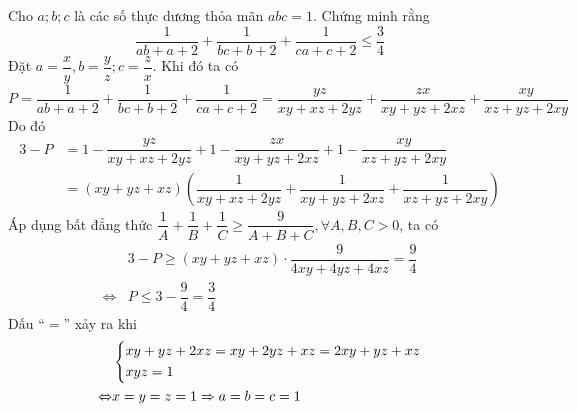 \begin{ex}%
   Cho $a;b;c$ là các số thực dương thỏa mãn $abc=1$. Chứng minh rằng \[\dfrac{1}{ab+a+2}+\dfrac{1}{bc+b+2}+\dfrac{1}{ca+c+2}\le \dfrac{3}{4}\]
\loigiai
{
Đặt $a=\dfrac{x}{y},b=\dfrac{y}{z};c=\dfrac{z}{x}$. Khi đó ta có \[P=\dfrac{1}{ab+a+2}+\dfrac{1}{bc+b+2}+\dfrac{1}{ca+c+2}=\dfrac{yz}{xy+xz+2yz}+\dfrac{zx}{xy+yz+2xz}+\dfrac{xy}{xz+yz+2xy}\]
Do đó
\begin{align*}
	3-P&=1-\dfrac{yz}{xy+xz+2yz}+1-\dfrac{zx}{xy+yz+2xz}+1-\dfrac{xy}{xz+yz+2xy} \\
	&=\left(xy+yz+xz\right)\left(\dfrac{1}{xy+xz+2yz}+\dfrac{1}{xy+yz+2xz}+\dfrac{1}{xz+yz+2xy}\right)
\end{align*}
Áp dụng bất đẳng thức $\dfrac{1}{A}+\dfrac{1}{B}+\dfrac{1}{C}\ge \dfrac{9}{A+B+C}, \forall A,B,C>0$, ta có
\begin{align*}
	&3-P\ge \left(xy+yz+xz\right)\cdot \dfrac{9}{4xy+4yz+4xz}=\dfrac{9}{4} \\
	\Leftrightarrow  &P \le  3-\dfrac{9}{4}=\dfrac{3}{4}
\end{align*}
Dấu ``$=$'' xảy ra khi
\begin{align*}
	&\left\{\begin{aligned}& xy+yz+2xz=xy+2yz+xz=2xy+yz+xz \\ &xyz=1\end{aligned}\right. \\
	\Leftrightarrow  &x = y = z =1\Rightarrow a=b=c=1
\end{align*}
}
\end{ex}
